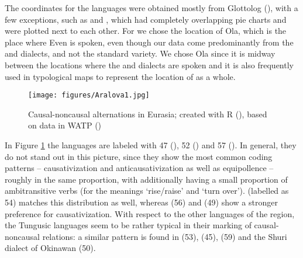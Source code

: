 \documentclass[output=paper,colorlinks,citecolor=brown]{langscibook}
\begin{document}
The coordinates for the languages were obtained mostly from Glottolog (\citealt{Hammarström2019}), with a few exceptions, such as  and , which had completely overlapping pie charts and were plotted next to each other. For  we chose the location of Ola, which is the place where  Even is spoken, even though our data come predominantly from the  and  dialects, and not the standard variety. We chose Ola since it is midway between the locations where the  and  dialects are spoken and it is also frequently used in typological maps to represent the location of  as a whole.

\begin{figure}
\texttt{[image: figures/Aralova1.jpg]}
\caption{Causal-noncausal alternations in Eurasia; created with R (\citeyear{R2020}), based on data in WATP (\citeyear{Atlas2014})}
\label{fig:2:1}
\end{figure}


In Figure \ref{fig:2:1} the  languages are labeled with 47 (), 52 () and 57 (). In general, they do not stand out in this picture, since they show the most common coding patterns – causativization and anticausativization as well as equipollence – roughly in the same proportion, with  additionally having a small proportion of ambitransitive verbs (for the meanings ‘rise/raise’ and ‘turn over’).  (labelled as 54) matches this distribution as well, whereas  (56) and  (49) show a stronger preference for causativization. With respect to the other languages of the region, the Tungusic languages seem to be rather typical in their marking of causal-noncausal relations: a similar pattern is found in  (53),  (45),  (59) and the Shuri dialect of Okinawan (50).
\end{document}
